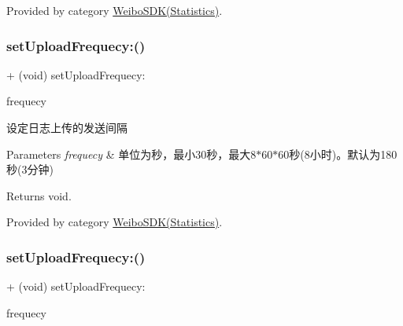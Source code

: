 Provided by category \mbox{\hyperlink{category_weibo_s_d_k_07_statistics_08_a2e009db32a6d059ff53e35ac211d57f9}{Weibo\+S\+D\+K(\+Statistics)}}.

\mbox{\label{interface_weibo_s_d_k_a6790cf45454697f2b846eb080a130ef2}} 
\subsubsection{\texorpdfstring{set\+Upload\+Frequecy\+:()}{setUploadFrequecy:()}\hspace{0.1cm}{\footnotesize\ttfamily [1/3]}}
{\footnotesize\ttfamily + (void) set\+Upload\+Frequecy\+: \begin{DoxyParamCaption}\item[{(N\+S\+Time\+Interval)}]{frequecy }\end{DoxyParamCaption}}

设定日志上传的发送间隔 
\begin{DoxyParams}{Parameters}
{\em frequecy} & 单位为秒，最小30秒，最大8$\ast$60$\ast$60秒(8小时)。默认为180秒(3分钟) \\
\hline
\end{DoxyParams}
\begin{DoxyReturn}{Returns}
void. 
\end{DoxyReturn}


Provided by category \mbox{\hyperlink{category_weibo_s_d_k_07_statistics_08_a6790cf45454697f2b846eb080a130ef2}{Weibo\+S\+D\+K(\+Statistics)}}.

\mbox{\label{interface_weibo_s_d_k_a6790cf45454697f2b846eb080a130ef2}} 
\subsubsection{\texorpdfstring{set\+Upload\+Frequecy\+:()}{setUploadFrequecy:()}\hspace{0.1cm}{\footnotesize\ttfamily [2/3]}}
{\footnotesize\ttfamily + (void) set\+Upload\+Frequecy\+: \begin{DoxyParamCaption}\item[{(N\+S\+Time\+Interval)}]{frequecy }\end{DoxyParamCaption}}

